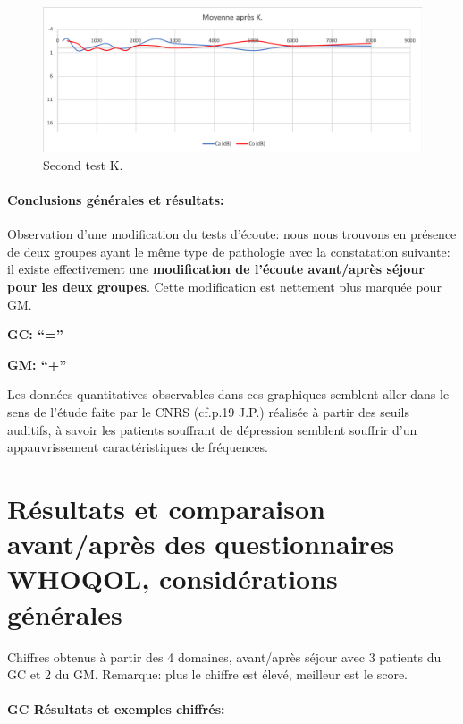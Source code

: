                  \begin{figure}
\centering
\includegraphics[width=0.7\linewidth]{images/graphiques/kad_post.png}
\caption[Moyenne OG+OD]{Second test K.}
       
\label{groupecontroleimage1}
\end{figure}
	\begin{enumerate}


          \paragraph{ Conclusions générales et résultats:}

   Observation
             d'une modification du tests d'écoute: nous nous trouvons
           en présence de deux groupes ayant le même type de
           pathologie avec la constatation suivante: il existe effectivement
          une \textbf{modification de l'écoute avant/après séjour pour les
          deux groupes}.
          Cette modification est nettement plus marquée
          pour GM.
         
          \textbf{GC:  ``=''}

          \textbf{GM: ``+''}

          
          
Les données quantitatives observables dans ces graphiques semblent aller dans le
sens de  l'étude faite par le
CNRS (cf.p.19 J.P.) réalisée à partir des seuils auditifs, à savoir
les patients souffrant de dépression semblent souffrir d'un
appauvrissement caractéristiques de fréquences.


\section{Résultats et comparaison avant/après des questionnaires WHOQOL,
  considérations générales}

Chiffres obtenus à partir des 4
domaines, avant/après séjour avec 3 patients du GC et 2 du GM.
Remarque: plus le chiffre est élevé, meilleur est le score.
\paragraph{ GC Résultats et exemples chiffrés:}




\end{enumerate}
